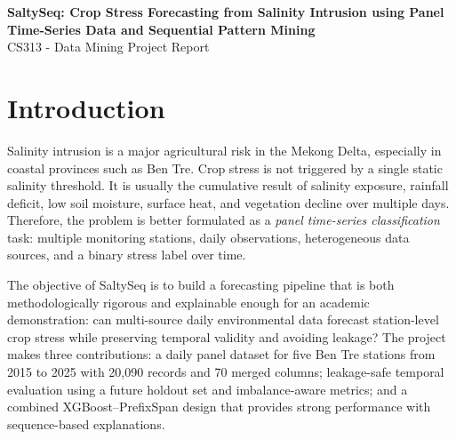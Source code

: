 \documentclass[a4paper, 11pt]{article}
\begin{document}
\coverpage

\thispagestyle{empty}
\newpage
\renewcommand{\contentsname}{Table of Contents}
\tableofcontents
\newpage
\small
\setlength{\parskip}{1pt}
\setlength{\parindent}{1em}
\setlength{\textfloatsep}{7pt plus 1pt minus 2pt}
\setlength{\floatsep}{6pt plus 1pt minus 2pt}
\setlength{\intextsep}{6pt plus 1pt minus 2pt}

\begin{center}
    {\Large\bfseries SaltySeq: Crop Stress Forecasting from Salinity Intrusion using Panel Time-Series Data and Sequential Pattern Mining}\\[0.35cm]
    {\normalsize CS313 - Data Mining Project Report}
\end{center}

\begin{abstract}
\noindent
This report presents SaltySeq, a data mining pipeline for forecasting crop stress caused by salinity intrusion at five monitoring stations in Ben Tre during 2015--2025. It constructs a daily panel dataset from satellite, weather, soil, and salinity signals, then derives rolling, lag, seasonal, and tendency features. To prevent temporal leakage, experiments use 2015--2022 for training, 2023--2025 for future holdout testing, and TimeSeriesSplit within the training set. The Optuna-tuned XGBoost model achieves test PR-AUC 0.9738, Recall 0.9387, and F2-score 0.9250. PrefixSpan provides interpretable environmental sequences, while GRU is explored as a high-recall but lower-precision deep learning extension.
\end{abstract}

\section{Introduction}

Salinity intrusion is a major agricultural risk in the Mekong Delta, especially in coastal provinces such as Ben Tre. Crop stress is not triggered by a single static salinity threshold. It is usually the cumulative result of salinity exposure, rainfall deficit, low soil moisture, surface heat, and vegetation decline over multiple days. Therefore, the problem is better formulated as a \textit{panel time-series classification} task: multiple monitoring stations, daily observations, heterogeneous data sources, and a binary stress label over time.

The objective of SaltySeq is to build a forecasting pipeline that is both methodologically rigorous and explainable enough for an academic demonstration: can multi-source daily environmental data forecast station-level crop stress while preserving temporal validity and avoiding leakage? The project makes three contributions: a daily panel dataset for five Ben Tre stations from 2015 to 2025 with 20,090 records and 70 merged columns; leakage-safe temporal evaluation using a future holdout set and imbalance-aware metrics; and a combined XGBoost--PrefixSpan design that provides strong performance with sequence-based explanations.
\end{document}
